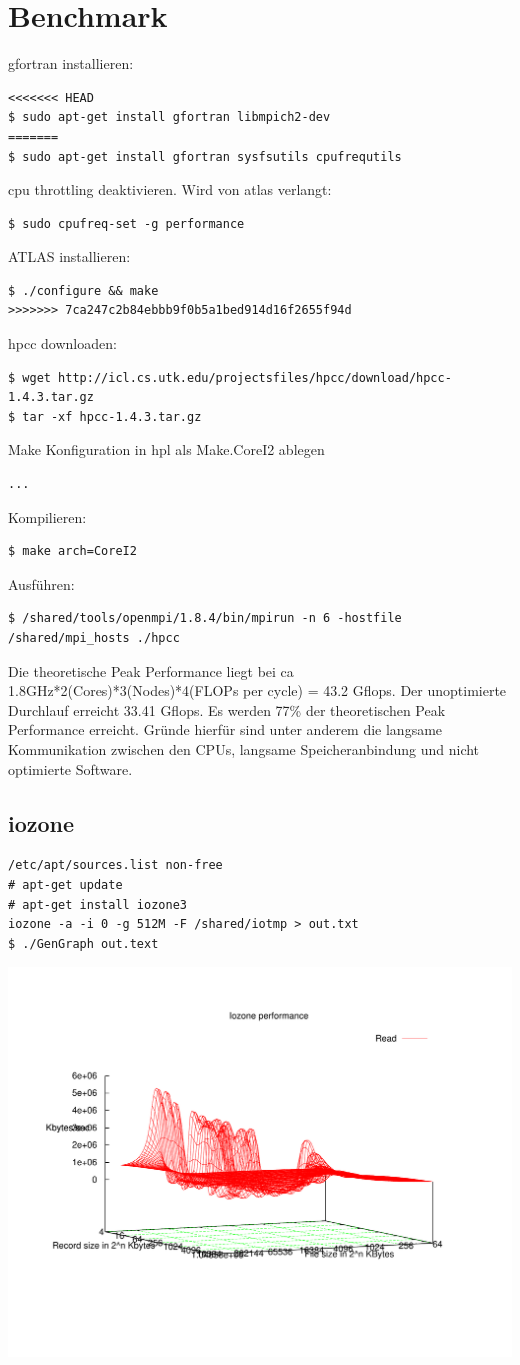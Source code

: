 \chapter{Benchmark}
gfortran installieren:
\begin{lstlisting}[style=Bash]
<<<<<<< HEAD
$ sudo apt-get install gfortran libmpich2-dev
=======
$ sudo apt-get install gfortran sysfsutils cpufrequtils
\end{lstlisting}
cpu throttling deaktivieren. Wird von atlas verlangt:
\begin{lstlisting}[style=Bash]
$ sudo cpufreq-set -g performance
\end{lstlisting}
ATLAS installieren:
\begin{lstlisting}[style=Bash]
$ ./configure && make
>>>>>>> 7ca247c2b84ebbb9f0b5a1bed914d16f2655f94d
\end{lstlisting}
hpcc downloaden:
\begin{lstlisting}[style=Bash]
$ wget http://icl.cs.utk.edu/projectsfiles/hpcc/download/hpcc-1.4.3.tar.gz
$ tar -xf hpcc-1.4.3.tar.gz
\end{lstlisting}
Make Konfiguration in hpl als Make.CoreI2 ablegen
\begin{lstlisting}[style=Bash]
...
\end{lstlisting}
Kompilieren:
\begin{lstlisting}[style=Bash]
$ make arch=CoreI2
\end{lstlisting}
Ausführen:
\begin{lstlisting}[style=Bash]
$ /shared/tools/openmpi/1.8.4/bin/mpirun -n 6 -hostfile /shared/mpi_hosts ./hpcc
\end{lstlisting}
Die theoretische Peak Performance liegt bei ca 1.8GHz*2(Cores)*3(Nodes)*4(FLOPs per cycle) = 43.2 Gflops.
Der unoptimierte Durchlauf erreicht 33.41 Gflops. Es werden 77\% der theoretischen Peak Performance erreicht.
Gründe hierfür sind unter anderem die langsame Kommunikation zwischen den CPUs, langsame Speicheranbindung und nicht optimierte Software.\\
\section{iozone}
\begin{lstlisting}[style=Bash]
/etc/apt/sources.list non-free
# apt-get update
# apt-get install iozone3
iozone -a -i 0 -g 512M -F /shared/iotmp > out.txt
$ ./GenGraph out.text
\end{lstlisting}
\includegraphics[scale=0.7]{read.pdf}
